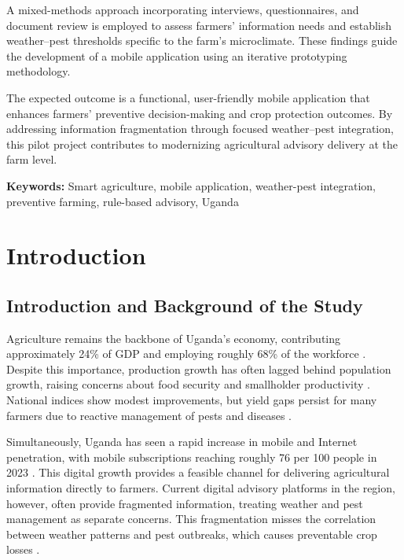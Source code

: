 \documentclass[12pt]{report}
\begin{document}
A mixed-methods approach incorporating interviews, questionnaires, and document review is employed to assess farmers' information needs and establish weather--pest thresholds specific to the farm's microclimate. These findings guide the development of a mobile application using an iterative prototyping methodology.

The expected outcome is a functional, user-friendly mobile application that enhances farmers' preventive decision-making and crop protection outcomes. By addressing information fragmentation through focused weather--pest integration, this pilot project contributes to modernizing agricultural advisory delivery at the farm level.

\bigskip
\textbf{Keywords:} Smart agriculture, mobile application, weather-pest integration, preventive farming, rule-based advisory, Uganda

\newpage
\tableofcontents

\newpage
\listoffigures
{}

\newpage
\listoftables
{}

\newpage
{}

\chapter{Introduction}
\label{chapter:introduction}

\section{Introduction and Background of the Study}
Agriculture remains the backbone of Uganda's economy, contributing approximately 24\% of GDP and employing roughly 68\% of the workforce \cite{UBOS2023}. Despite this importance, production growth has often lagged behind population growth, raising concerns about food security and smallholder productivity \cite{AgriculturalGrowth2022}. National indices show modest improvements, but yield gaps persist for many farmers due to reactive management of pests and diseases \cite{FAO2022}.

Simultaneously, Uganda has seen a rapid increase in mobile and Internet penetration, with mobile subscriptions reaching roughly 76 per 100 people in 2023 \cite{ITU2023}. This digital growth provides a feasible channel for delivering agricultural information directly to farmers. Current digital advisory platforms in the region, however, often provide fragmented information, treating weather and pest management as separate concerns. This fragmentation misses the correlation between weather patterns and pest outbreaks, which causes preventable crop losses \cite{MAAIF2020}.
\end{document}
